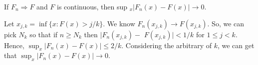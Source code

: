 \documentclass[en, normal, 12pt, black]{elegantnote}
\newenvironment{exercise}[1]{\begin{tcolorbox}[colback=black!15, colframe=black!80, breakable, title=#1]}{\end{tcolorbox}}
\newenvironment{solution}{\begin{tcolorbox}[colback=white, colframe=black!50, breakable, title=Solution. ]\setlength{\parskip}{0.8em}}{\end{tcolorbox}}
\begin{document}


    \begin{exercise}{3.2.9}
        If $F_{n} \Rightarrow F$ and $F$ is continuous, then sup $_{x}\left|F_{n}(x)-F(x)\right| \rightarrow 0$. 
    \end{exercise}

    \begin{solution}
        Let $x_{j, k}=\inf \{x: F(x)>j / k\}$. We know $F_{n}\left(x_{j, k}\right) \rightarrow F\left(x_{j, k}\right)$. So, we can pick $N_{k}$ so that if $n \geqslant N_{k}$ then $| F_{n}\left(x_{j, k}\right)-$ $F\left(x_{j, k}\right) |<1 / k$ for $1 \leq j<k$. Hence, $\sup _{x}\left|F_{n}(x)-F(x)\right| \leq 2 / k$. Considering the arbitrary of $k$, we can get that $\sup_x\left|F_{n}(x)-F(x)\right| \rightarrow 0$. 
    \end{solution}

        

\end{document}

